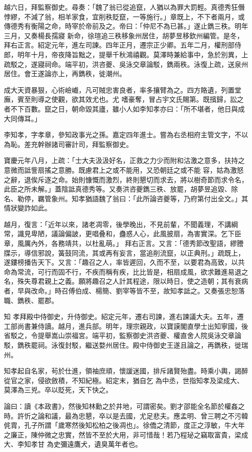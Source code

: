 \begin{pinyinscope}
 越六日，拜監察御史。尋奏：「魏了翁已從追竄，人猶以為罪大罰輕。真德秀狂僭悖繆，不減了翁，相羊家食，宜削秩貶竄，一等施行。」章既上，不下者兩月，或傳德秀有衡陽之命，時宰於帝前及之。帝曰：「仲尼不為已甚。」遂止鐫三秩。明年三月，又奏楊長孺寢
 新命，徐瑄追三秩移象州居住，胡夢昱移欽州編管。是冬，拜右正言。紹定元年，進左司諫。四年正月，遷宗正少卿。五年二月，權刑部侍郎，明年十月，帝夜降旨黜之，提舉千秋鴻禧觀。莫澤時兼給事中，急於別異，上疏駁之，遂寢祠命。端平初，洪咨夔、吳泳交章論駁，鐫兩秩。泳復上疏，送泉州居住。會王遂論亦上，再鐫秩，徙潮州。



 成大天資暴狠，心術嶮巇，凡可賊忠害良者，率多攘臂為之。四方賂遺，列置堂廡，賓至則導之使觀，欲其效尤也。尤
 嗜豪奪，冒占宇文氏賜第。既擯歸，訟之者不下百數。竄之日，朝命毀其廬，雖小人如李知孝亦曰：「所不堪者，他日與成大同傳耳。」



 李知孝，字孝章，參知政事光之孫。嘉定四年進士。嘗為右丞相府主管文字，不以為恥。差充幹辦諸司審計司，拜監察御史。



 寶慶元年八月，上疏：「士大夫汲汲好名，正救之力少而附和沽激之意多，扶持之意微而詆訾扇搖之意勝。既慮君上之或不能用，又恐朝廷之或不能
 容，姑為激怒之辭，退俟斥逐之命。始則慷慨而激烈，終則懇切而求去，將以樹奇節而求令名，此臣之所未解。」蓋陰詆真德秀等。又奏洪咨夔鐫三秩、放罷，胡夢昱追毀、除名、勒停，羈管象州。知孝猶語魏了翁曰：「此所論咨夔等，乃府第付出全文。」其情狀變詐如此。



 越月，復言：「近年以來，諸老凋零，後學晚出，不見前輩，不聞義理，不講綱常，識見卑陋，議論偏詖，更唱叠和，蠱惑人心，此風披扇，為害實深。乞下臣章，風厲內外，各務靖共，以杜亂萌。」
 拜右正言。又言：「德秀節改聖語，繆謄牒示，導信邪說，簧鼓同流，其或再有妄言，當追削流竄，以正典刑。」疏既上，遂鏤榜播告天下。又言：「趣召之人，率皆遲回，久而不至，以要君為高致，以共命為常流，可行而固不行，不疾而稱有疾，比比皆是，相扇成風，欲求難進易退之名，殊失尊君親上之義。願將趣召之人計其程途，限以時日，使之造朝；其有衰病者，早與改命。」時召傅伯成、楊簡、劉宰等皆不至，故知孝詆之。又奏張忠恕落職、鐫秩、罷郡。



 知
 孝拜殿中侍御史，升侍御史。紹定元年，遷右司諫，進右諫議大夫。五年，遷工部尚書兼侍讀。越月，進兵部。明年，理宗親政，以寶謨閣直學士出知寧國，後省駁之，令提舉嵩山崇福宮。端平初，監察御史洪咨夔、權直舍人院吳泳交章論駁，鐫秩罷祠。泳復封駁，繼送婺州居住。殿中侍御史王遂且論之，再鐫秩，徙瑞州。



 知孝起自名家，茍於仕進，領袖庶頑，懷諼迷國，排斥諸賢殆盡。時乘小輿，謁醉從官之家，侵欲斂積，不知紀極。紹定末，猶自乞
 為中丞，世指知孝及梁成大、莫澤為三兇。卒以貶死，天下快之。



 論曰：讀《本政書》，然後知林勳之於井地，可謂密矣。劉才邵能全名節於權姦之時。許忻之論和議，最為忠懇，卒以是去國，尤足悲夫。應孟明、曾三聘之不污韓侂胄，孔子所謂「歲寒然後知松柏之後凋也」。徐僑之清節，度正之淳敏，牛大年之廉正，陳仲微之忠實，然皆不至於大用，非可惜哉！若乃程珌之竊取富貴，梁成大、李知孝甘
 為史彌遠鷹犬，遺臭萬年者也。



\end{pinyinscope}